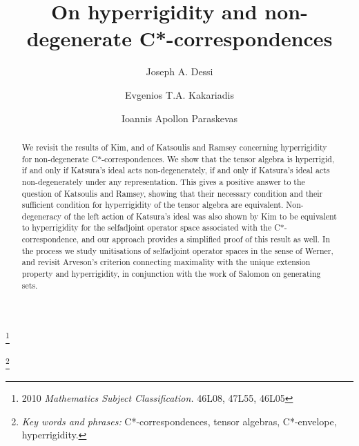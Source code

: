 \documentclass[11pt, draft]{amsart}
\numberwithin{equation}{section}
\theoremstyle{plain}
\theoremstyle{definition}
\theoremstyle{remark}
\begin{document}

\title[Hyperrigidity and non-degenerate C*-correspondences]{On hyperrigidity and non-degenerate C*-correspondences}

\author[J.A. Dessi]{Joseph A. Dessi}
\address{School of Mathematics, Statistics and Physics\\ Newcastle University\\ Newcastle upon Tyne\\ NE1 7RU\\ UK}

\author[E.T.A. Kakariadis]{Evgenios T.A. Kakariadis}
\address{School of Mathematics, Statistics and Physics\\ Newcastle University\\ Newcastle upon Tyne\\ NE1 7RU\\ UK}

\author[I.A. Paraskevas]{Ioannis Apollon Paraskevas}
\address{Department of Mathematics\\ National and Kapodistrian University of Athens\\ Athens\\ 1578 84\\ Greece}

\thanks{2010 {\it  Mathematics Subject Classification.} 46L08, 47L55, 46L05}

\thanks{{\it Key words and phrases:} C*-correspondences, tensor algebras, C*-envelope, hyperrigidity.}

\begin{abstract}
We revisit the results of Kim, and of Katsoulis and Ramsey concerning hyperrigidity for non-degenerate C*-correspondences.
We show that the tensor algebra is hyperrigid, if and only if Katsura's ideal acts non-degenerately, if and only if Katsura's ideal acts non-degenerately under any representation.
This gives a positive answer to the question of Katsoulis and Ramsey, showing that their necessary condition and their sufficient condition for hyperrigidity of the tensor algebra are equivalent.
Non-degeneracy of the left action of Katsura's ideal was also shown by Kim to be equivalent to hyperrigidity for the selfadjoint operator space associated with the C*-correspondence, and our approach provides a simplified proof of this result as well.
In the process we study unitisations of selfadjoint operator spaces in the sense of Werner, and revisit Arveson's criterion connecting maximality with the unique extension property and hyperrigidity, in conjunction with the work of Salomon on generating sets.
\end{abstract}
\end{document}
